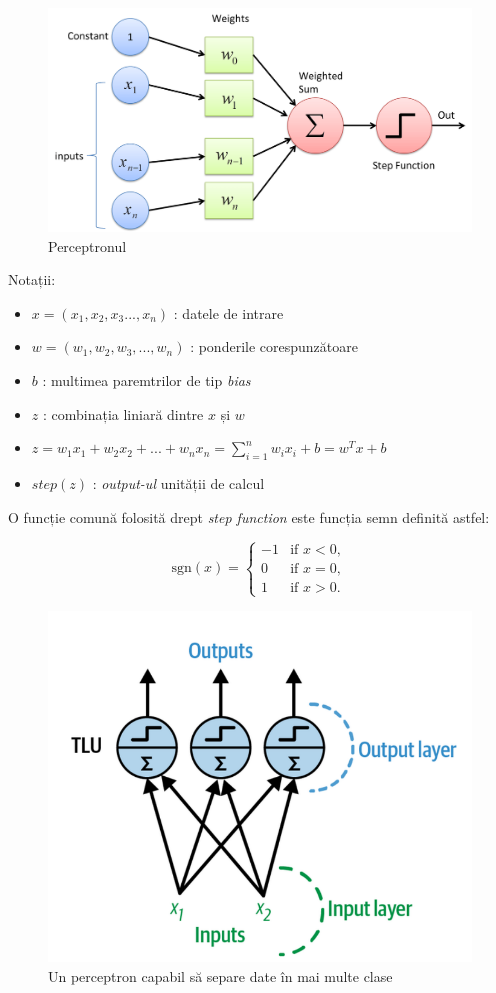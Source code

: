 \begin{figure}[h]
         \centering 
         \includegraphics[width=.85\textwidth]{images/the-perceptron.jpg}
         \captionsetup{font=footnotesize}
         \caption{Perceptronul \cite{the-perecptron}}
\end{figure}
\newpage
Notații:

\begin{itemize}
    \item $x = (x_1, x_2, x_3... , x_n)$ : datele de intrare
    \item $w = (w_1, w_2, w_3,..., w_n)$ : ponderile corespunzătoare 
    \item $b$ : multimea paremtrilor de tip \textit{bias} 
    \item $z$ : combinația liniară dintre $x$ și $w$
    \item $z = w_1 x_1 + w_2 x_2 + ... + w_n x_n  = \sum_{i=1}^{n} w_i x_i + b = w^{T}x + b$
    \item $step(z)$ : \textit{output-ul} unității de calcul
\end{itemize}
 
O funcție comună folosită drept \textit{step function} este funcția semn definită astfel: 

\[
\text{sgn}(x) = 
\begin{cases} 
    -1 & \text{if } x < 0, \\
    0 & \text{if } x = 0, \\
    1 & \text{if } x > 0.
\end{cases}
\]    

\begin{figure}[h]
         \centering 
         \includegraphics[width=.5\linewidth]{images/multiclass-perceptron.png}
         \captionsetup{font=footnotesize}
         \caption{Un perceptron capabil să separe date în mai multe clase \cite{ageron2019}}
         \label{Figura 2.4}
\end{figure}
\newpage

